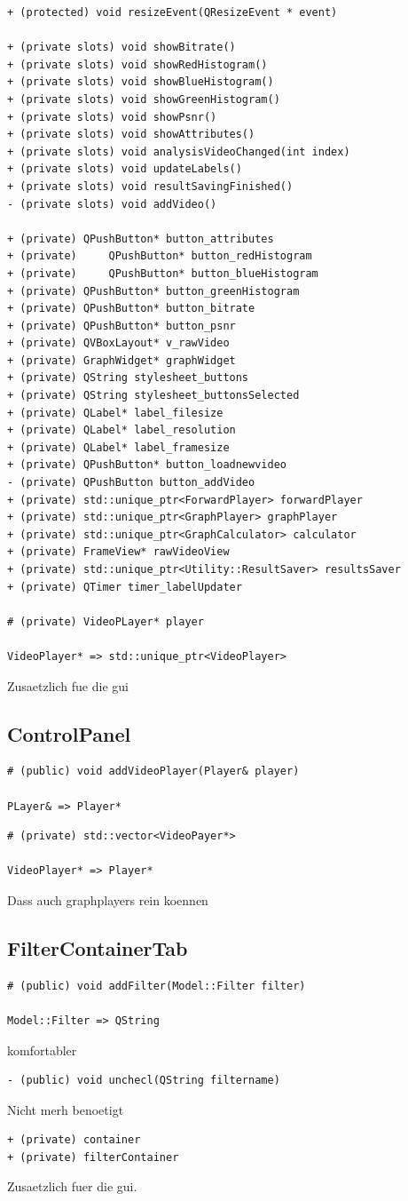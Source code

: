 \documentclass[parskip=full]{scrartcl}
\begin{document}
\begin{verbatim}
+ (protected) void resizeEvent(QResizeEvent * event)

+ (private slots) void showBitrate()
+ (private slots) void showRedHistogram()
+ (private slots) void showBlueHistogram()
+ (private slots) void showGreenHistogram()
+ (private slots) void showPsnr()
+ (private slots) void showAttributes()
+ (private slots) void analysisVideoChanged(int index)
+ (private slots) void updateLabels()
+ (private slots) void resultSavingFinished()
- (private slots) void addVideo()

+ (private) QPushButton* button_attributes
+ (private) 	QPushButton* button_redHistogram
+ (private) 	QPushButton* button_blueHistogram
+ (private) QPushButton* button_greenHistogram
+ (private) QPushButton* button_bitrate
+ (private) QPushButton* button_psnr
+ (private) QVBoxLayout* v_rawVideo
+ (private) GraphWidget* graphWidget
+ (private) QString stylesheet_buttons
+ (private) QString stylesheet_buttonsSelected
+ (private) QLabel* label_filesize
+ (private) QLabel* label_resolution
+ (private) QLabel* label_framesize
+ (private) QPushButton* button_loadnewvideo
- (private) QPushButton button_addVideo
+ (private) std::unique_ptr<ForwardPlayer> forwardPlayer
+ (private) std::unique_ptr<GraphPlayer> graphPlayer
+ (private) std::unique_ptr<GraphCalculator> calculator
+ (private) FrameView* rawVideoView
+ (private) std::unique_ptr<Utility::ResultSaver> resultsSaver
+ (private) QTimer timer_labelUpdater
	
# (private) VideoPLayer* player

VideoPlayer* => std::unique_ptr<VideoPlayer>
\end{verbatim}
Zusaetzlich fue die gui
\subsection{ControlPanel}
\begin{verbatim}
# (public) void addVideoPlayer(Player& player)

PLayer& => Player*
\end{verbatim}
\begin{verbatim}
# (private) std::vector<VideoPayer*>

VideoPlayer* => Player*
\end{verbatim}
Dass auch graphplayers rein koennen
\subsection{FilterContainerTab}
\begin{verbatim}
# (public) void addFilter(Model::Filter filter)

Model::Filter => QString
\end{verbatim}
komfortabler
\begin{verbatim}
- (public) void unchecl(QString filtername)
\end{verbatim}
Nicht merh benoetigt
\begin{verbatim}
+ (private) container
+ (private) filterContainer
\end{verbatim}
Zusaetzlich fuer die gui.
\end{document}
